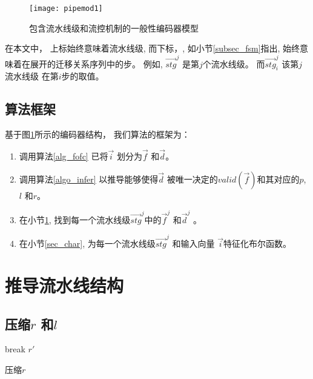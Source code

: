 \begin{figure}[b]
\begin{center}
\texttt{[image: pipemod1]}
\end{center}
\caption{包含流水线级和流控机制的一般性编码器模型}
  \label{fig_pipeenc}
\end{figure}



在本文中，
上标始终意味着流水线级,
而下标，,
如小节\ref{subsec_fsm}指出,
始终意味着在展开的迁移关系序列中的步。
例如,
$\vec{stg}^j$ 是第$j$个流水线级。
而$\vec{stg}^j_i$ 该第$j$流水线级
在第$i$步的取值。

\subsection{算法框架}

基于图\ref{fig_pipeenc}所示的编码器结构，
我们算法的框架为：

\begin{enumerate}
 \item 调用算法\ref{alg_fofc} 已将$\vec{i}$ 划分为$\vec{f}$ 和$\vec{d}$。
 \item 调用算法\ref{algo_infer} 以推导能够使得$\vec{d}$
 被唯一决定的$valid(\vec{f})$和其对应的$p$, $l$ 和$r$。
 \item 在小节\ref{sec_pipeinfer},
 找到每一个流水线级$\vec{stg}^j$中的$\vec{f}^j$ 和$\vec{d}^j$ 。
 \item 在小节\ref{sec_char},
 为每一个流水线级$\vec{stg}^j$
 和输入向量 $\vec{i}$特征化布尔函数。
\end{enumerate}



\section{推导流水线结构}\label{sec_pipeinfer}


\subsection{压缩$r$ 和$l$}\label{reduceing}

\begin{algorithm}[t]
\begin{algorithmic}[1]
\label{testr_1}
    \STATE break
  \ENDIF
\ENDFOR
\RETURN $r'$
\caption{压缩$r$}
\label{algo_remove2}
\end{algorithmic}
\end{algorithm}

